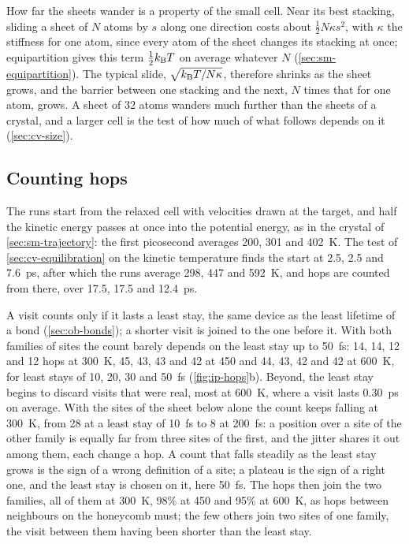 How far the sheets wander is a property of the small cell. Near its best
stacking, sliding a sheet of $N$ atoms by $s$ along one direction costs
about $\frac12N\kappa s^2$, with $\kappa$ the stiffness for one atom,
since every atom of the sheet changes its stacking at once; equipartition
gives this term $\frac12k_{\mathrm{B}} T$ on average whatever $N$
(\cref{sec:sm-equipartition}). The typical slide, $\sqrt{k_{\mathrm{B}} T/N\kappa}$,
therefore shrinks as the sheet grows, and the barrier between one
stacking and the next, $N$ times that for one atom, grows. A sheet of 32
atoms wanders much further than the sheets of a crystal, and a larger
cell is the test of how much of what follows depends on it
(\cref{sec:cv-size}).

\subsection*{Counting hops}

The runs start from the relaxed cell with velocities drawn at the target,
and half the kinetic energy passes at once into the potential energy, as
in the crystal of \cref{sec:sm-trajectory}: the first picosecond averages
200, 301 and \SI{402}{\kelvin}. The test of \cref{sec:cv-equilibration}
on the kinetic temperature finds the start at 2.5, 2.5 and
\SI{7.6}{\pico\second}, after which the runs average 298, 447 and
\SI{592}{\kelvin}, and hops are counted from there, over 17.5, 17.5 and
\SI{12.4}{\pico\second}.

A visit counts only if it lasts a least stay, the same device as the
least lifetime of a bond (\cref{sec:ob-bonds}); a shorter visit is joined
to the one before it. With both families of sites the count barely
depends on the least stay up to \SI{50}{\femto\second}: 14, 14, 12 and
12 hops at \SI{300}{\kelvin}, 45, 43, 43 and 42 at 450 and 44, 43, 42
and 42 at \SI{600}{\kelvin}, for least stays of 10, 20, 30 and
\SI{50}{\femto\second} (\cref{fig:ip-hops}b). Beyond, the least stay
begins to discard visits that were real, most at \SI{600}{\kelvin}, where
a visit lasts \SI{0.30}{\pico\second} on average. With the sites of the
sheet below alone the count keeps falling at \SI{300}{\kelvin}, from 28
at a least stay of \SI{10}{\femto\second} to 8 at
\SI{200}{\femto\second}: a position over a site of the other family is
equally far from three sites of the first, and the jitter shares it out
among them, each change a hop. A count that falls steadily as the least
stay grows is the sign of a wrong definition of a site; a plateau is the
sign of a right one, and the least stay is chosen on it, here
\SI{50}{\femto\second}. The hops then join the two families, all of them
at \SI{300}{\kelvin}, 98\% at 450 and 95\% at \SI{600}{\kelvin}, as hops
between neighbours on the honeycomb must; the few others join two sites
of one family, the visit between them having been shorter than the least
stay.

